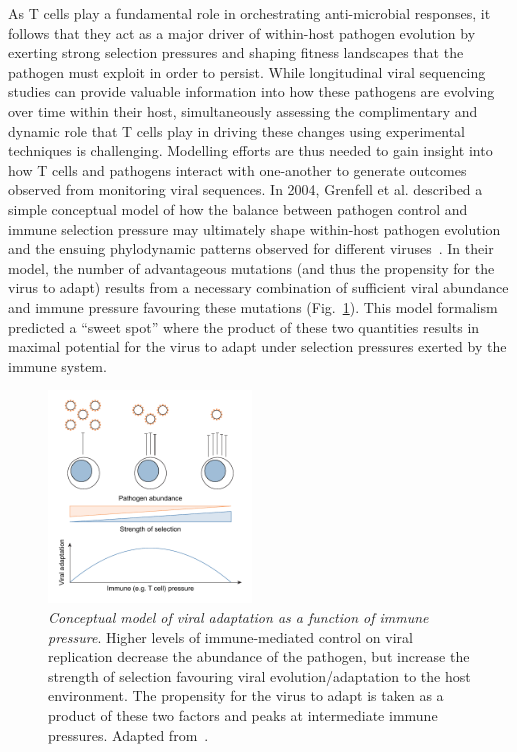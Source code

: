 As T cells play a fundamental role in orchestrating anti-microbial responses, it follows that they act as a major driver of within-host pathogen evolution by exerting strong selection pressures and shaping fitness landscapes that the pathogen must exploit in order to persist. While longitudinal viral sequencing studies can provide valuable information into how these pathogens are evolving over time within their host, simultaneously assessing the complimentary and dynamic role that T cells play in driving these changes using experimental techniques is challenging. Modelling efforts are thus needed to gain insight into how T cells and pathogens interact with one-another to generate outcomes observed from monitoring viral sequences. In 2004, Grenfell et al. described a simple conceptual model of how the balance between pathogen control and immune selection pressure may ultimately shape within-host pathogen evolution and the ensuing phylodynamic patterns observed for different viruses~\cite{grenfell2004unifying}. In their model, the number of advantageous mutations (and thus the propensity for the virus to adapt) results from a necessary combination of sufficient viral abundance and immune pressure favouring these mutations (Fig.~\ref{fig:intro_abundanceVsPressure}). This model formalism predicted a ``sweet spot'' where the product of these two quantities results in maximal potential for the virus to adapt under selection pressures exerted by the immune system.

\begin{figure}
    \centering
    \includegraphics[width=0.48\textwidth]{Figures/intro/fig10_abundanceVsPressure.pdf}
    \caption[Conceptual model of viral adaptation as a function of immune pressure]{%
    \textit{Conceptual model of viral adaptation as a function of immune pressure}. %
    Higher levels of immune-mediated control on viral replication decrease the abundance of the pathogen, but increase the strength of selection favouring viral evolution/adaptation to the host environment. The propensity for the virus to adapt is taken as a product of these two factors and peaks at intermediate immune pressures. Adapted from~\cite{grenfell2004unifying}.}
    \label{fig:intro_abundanceVsPressure}
\end{figure}

